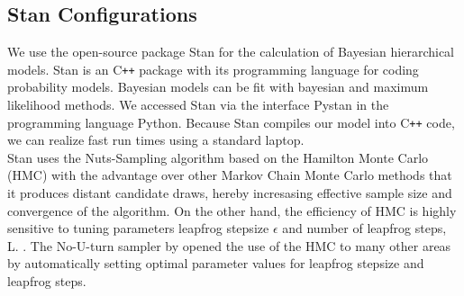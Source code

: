 \subsection{Stan Configurations}
We use the open-source package Stan for the calculation of  Bayesian hierarchical models. Stan is an C\texttt{++} package with its programming language for coding probability models.  Bayesian models can be fit with bayesian and maximum likelihood methods. We accessed Stan via the interface Pystan in the programming language Python. Because Stan compiles our model into C\texttt{++} code, we can realize fast run times using a standard laptop.\\
Stan uses the Nuts-Sampling algorithm based on the Hamilton Monte Carlo (HMC) with the advantage  over other Markov Chain Monte Carlo methods that it produces distant candidate draws, hereby incresasing effective sample size and convergence of the algorithm.
On the other hand, the efficiency of HMC is highly sensitive to tuning parameters leapfrog stepsize $\epsilon$ and number of leapfrog steps, L. \cite{neal2011}. %
The No-U-turn sampler by \cite{hoffman2014} opened the use of the HMC to many other areas by automatically setting optimal parameter values for leapfrog stepsize and leapfrog steps. \\
